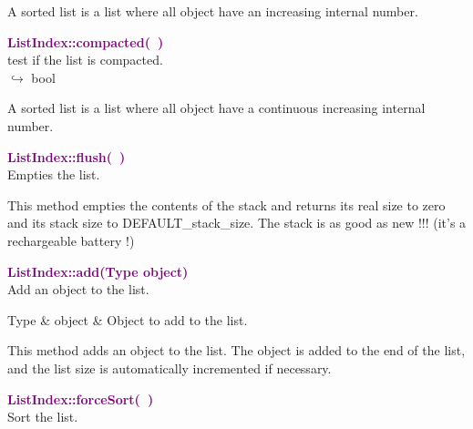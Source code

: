 A sorted list is a list where all object have an increasing internal number.

\textcolor{purple}{\textbf{ListIndex::compacted(~)}}\label{ListIndex::compacted()}\\
test if the list is compacted.\\ \hspace*{10mm}$\hookrightarrow$ bool

A sorted list is a list where all object have a continuous increasing internal number.

\textcolor{purple}{\textbf{ListIndex::flush(~)}}\label{ListIndex::flush()}\\
Empties the list.

This method empties the contents of the stack and returns its real size to zero and its stack size to DEFAULT\_stack\_size.
The stack is as good as new !!! (it's a rechargeable battery !)

\textcolor{purple}{\textbf{ListIndex::add(Type object)}}\label{ListIndex::add(Type object)}\\
Add an object to the list.

\begin{tcolorbox}[width=\textwidth,myArgs,tabularx={ll|R}]
Type & object & Object to add to the list.
\end{tcolorbox}

This method adds an object to the list. The object is added to the end of the list, and the list size is automatically incremented if necessary.

\textcolor{purple}{\textbf{ListIndex::forceSort(~)}}\label{ListIndex::forceSort()}\\
Sort the list.

